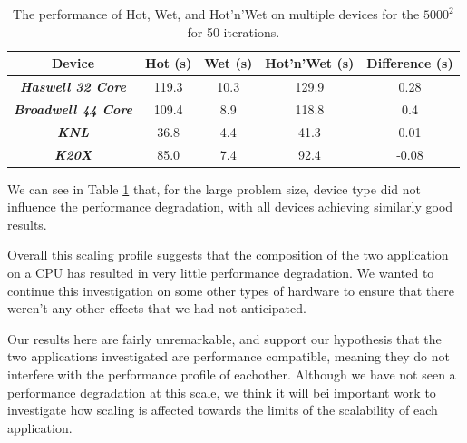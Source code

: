 \documentclass[runningheads,a4paper]{llncs}
\begin{document}
\begin{table}[h]
  \begin{center}
    \begin{tabular}{ccccc}
      \hline
      \textbf{Device} & \textbf{Hot (s)} & \textbf{Wet (s)} & \textbf{Hot'n'Wet (s)} & \textbf{Difference (s)} \\
      \hline
      \textit{\textbf{Haswell 32 Core}} & 119.3 & 10.3 & 129.9 & 0.28\\
      \textit{\textbf{Broadwell 44 Core}} & 109.4 & 8.9 & 118.8 & 0.4\\
      \textit{\textbf{KNL}} & 36.8 & 4.4 & 41.3 & 0.01 \\
      \textit{\textbf{K20X}} & 85.0 & 7.4 & 92.4 & -0.08 \\
    \end{tabular}
  \end{center}
  \caption{The performance of Hot, Wet, and Hot'n'Wet on multiple devices for the $5000^2$ for 50 iterations.}
  \label{tab:hot-wet-multi-device}
\end{table}

We can see in Table \ref{tab:hot-wet-multi-device} that, for the large problem size, device type did not influence the performance degradation, with all devices achieving similarly good results.

Overall this scaling profile suggests that the composition of the two application on a CPU has resulted in very little performance degradation. We wanted to continue this investigation on some other types of hardware to ensure that there weren't any other effects that we had not anticipated.

%


Our results here are fairly unremarkable, and support our hypothesis that the two applications investigated are performance compatible, meaning they do not interfere with the performance profile of eachother. Although we have not seen a performance degradation at this scale, we think it will bei important work to investigate how scaling is affected towards the limits of the scalability of each application.
\end{document}
